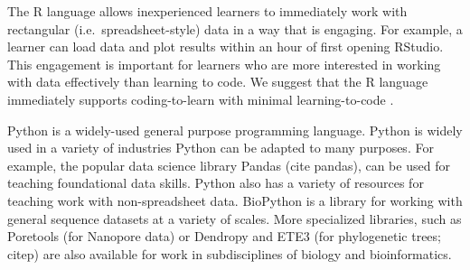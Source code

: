 


The R language allows inexperienced learners to immediately work with rectangular (i.e.\ spreadsheet-style) data in a way that is engaging. For example, a learner can load data and plot results within an hour of first opening RStudio. This engagement is important for learners who are more interested in working with data effectively than learning to code. We suggest that the R language immediately supports coding-to-learn with minimal learning-to-code \citep{}.

Python is a widely-used general purpose programming language.
Python is widely used in a variety of industries %
Python can be adapted to many purposes. 
For example, the popular data science library Pandas (cite pandas), can be used for teaching foundational data skills.
Python also has a variety of resources for teaching work with non-spreadsheet data.
BioPython is a library for working with general sequence datasets at a variety of scales. 
More specialized libraries, such as Poretools (for Nanopore data) or Dendropy and ETE3 (for phylogenetic trees; citep{}) are also available for work in subdisciplines of biology and bioinformatics.

